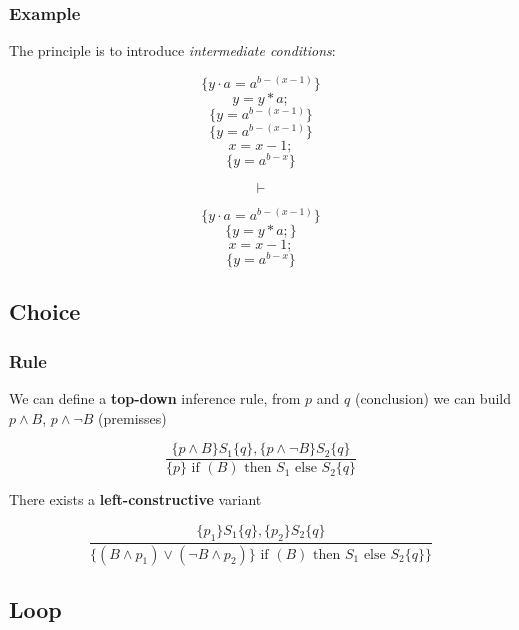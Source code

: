 \documentclass[12pt, a4paper]{book}
\begin{document}
    \subsubsection{Example}

    The principle is to introduce \textit{intermediate conditions}:
    \bigskip

    \begin{minipage}{\linewidth}
        \begin{minipage}{0.4\linewidth}
            $$ \{ y \cdot a = {a}^{b-(x-1)} \}$$
            $$ y = y * a; $$
            $$ \{ y = {a}^{b-(x-1)} \} $$
            \bigskip
            $$ \{ y = {a}^{b-(x-1)} \} $$
            $$ x = x - 1; $$
            $$ \{ y = {a}^{b-x} \} $$
        \end{minipage}
        \begin{minipage}{0.05\linewidth}
            \Huge $$ \vdash $$
        \end{minipage}
        \begin{minipage}{0.4\linewidth}
            $$ \{ y \cdot a = {a}^{b-(x-1)} \} $$
            $$ \{ y = y * a; \} $$
            $$ x = x - 1; $$
            $$ \{ y = {a}^{b-x} \} $$
        \end{minipage}
    \end{minipage}

    \subsection{Choice}

    \subsubsection{Rule}

    We can define a \textbf{top-down} inference rule, from $p$ and $q$
    (conclusion) we can build $p \land B$, $p \land \lnot B$ (premisses)

    $$
    \frac
    { \{ p \land B \} S_1 \{ q \}, \{ p \land \lnot B \} S_2 \{ q \} }
    { \{ p \} \textrm{ if } (B) \textrm{ then } S_1 \textrm{ else } S_2 \{ q \} }
    $$

    There exists a \textbf{left-constructive} variant

    $$
    \frac
    { \{ p_1 \} S_1 \{ q \}, \{ p_2 \} S_2 \{ q \} }
    { \{ (B \land p_1 ) \lor (\lnot B \land p_2 ) \} \textrm{ if } (B) \textrm{ then } S_1 \textrm{ else } S_2 \{ q \} \} }
    $$

    \subsection{Loop}
\end{document}
